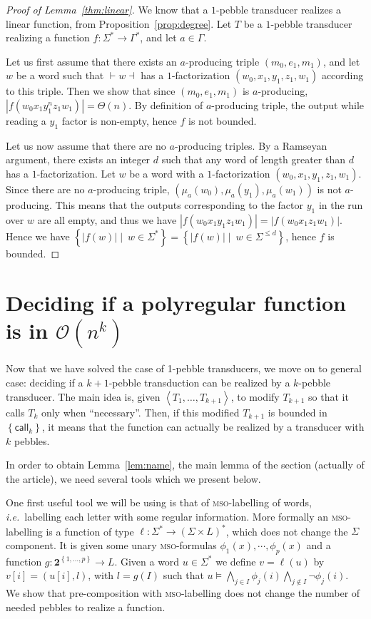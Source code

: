 \documentclass[sigplan,review,anonymous]{acmart}\settopmatter{printfolios=true,printccs=false,printacmref=false}
\newcommand{\set}[1]{\left\{#1 \right\}}
\newcommand{\atuple}[1]{\left\langle #1 \right\rangle}
\newcommand{\Oo}{\mathcal O}
\newcommand{\mso}{\textsc{mso}\xspace}
\newcommand{\call}{\mathsf {call}}
\theoremstyle{definition}
\theoremstyle{remark}
\begin{document}
\begin{proof}[Proof of Lemma~\ref{thm:linear}]
    We know that a $1$-pebble transducer realizes a linear function, from Proposition~\ref{prop:degree}.
    Let $T$ be a $1$-pebble transducer realizing a function $f:\Sigma^*\to \Gamma^*$, and let $a\in \Gamma$.

    Let us first assume that there exists an $a$-producing triple $(m_0,e_1,m_1)$, and let $w$ be a word such that ${\vdash} w{\dashv }$ has a $1$-factorization $(w_0,x_1,y_1,z_1,w_1)$ according to this triple.
    Then we show that since $(m_0,e_1,m_1)$ is $a$-producing, $|f(w_0x_1y_1^nz_1w_1)|=\Theta(n)$.
    By definition of $a$-producing triple, the output while reading a $y_1$ factor is non-empty, hence $f$ is not bounded.

    Let us now assume that there are no $a$-producing triples.
    By a Ramseyan argument, there exists an integer $d$ such that any word of length greater than $d$ has a $1$-factorization.
    Let $w$ be a word with a $1$-factorization $(w_0,x_1,y_1,z_1,w_1)$. Since there are no $a$-producing triple, $(\mu_a(w_0),\mu_a(y_1),\mu_a(w_1))$ is not $a$-producing. This means that the outputs corresponding to the factor $y_1$ in the run over $w$ are all empty, and thus we have $|f(w_0x_1y_1z_1w_1)|=|f(w_0x_1z_1w_1)|$.
    Hence we have $\set{|f(w)|\mid\ w\in \Sigma^*}=\set{|f(w)|\mid\ w\in \Sigma^{\leq d}}$, hence $f$ is bounded.
\end{proof}



\section{Deciding if a polyregular function is in $\Oo(n^k)$}
\label{sec:poly}

Now that we have solved the case of 1-pebble transducers, we move on to general case: deciding if a $k+1$-pebble transduction can be realized by a $k$-pebble transducer. The main idea is, given $\atuple{T_1,\ldots,T_{k+1}}$, to modify $T_{k+1}$ so that it calls $T_k$ only when ``necessary''. Then, if this modified $T_{k+1}$ is bounded in $\set{\call_k}$, it means that the function can actually be realized by a transducer with $k$ pebbles.

In order to obtain Lemma~\ref{lem:name}, the main lemma of the section (actually of the article), we need several tools which we present below.

One first useful tool we will be using is that of \mso-labelling of words, \textit{i.e.}~labelling each letter with some regular information.
More formally an \mso-labelling is a function of type $\ell:\Sigma^*\rightarrow (\Sigma\times L)^*$, which does not change the $\Sigma$ component. It is given some unary \mso-formulas $\phi_1(x),\cdots,\phi_p(x)$ and a function $g:\mathbf 2^{\set{1,\ldots, p}}\rightarrow L$. Given a word $u\in \Sigma^*$ we define $v=\ell(u)$ by $v[i]=(u[i],l)$, with $l=g(I)$ such that $u\models \bigwedge_{j\in I}\phi_j(i)\bigwedge_{j\notin I}\neg \phi_j(i)$.
We show that pre-composition with \mso-labelling does not change the number of needed pebbles to realize a function.
\end{document}
